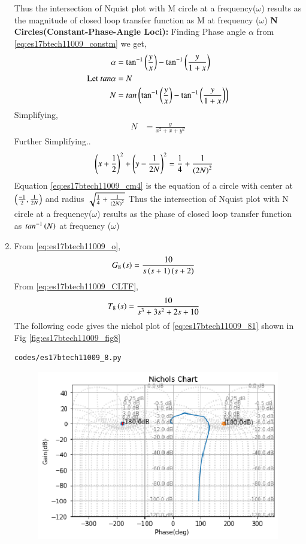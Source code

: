 \begin{enumerate}[label=\thesection.\arabic*.,ref=\thesection.\theenumi]
Thus the intersection of Nquist plot with M circle at a frequency($\omega$) results as the magnitude of closed loop transfer function as M at frequency ($\omega$)
\textbf{N Circles(Constant-Phase-Angle Loci):}
Finding Phase angle $\alpha$ from \eqref{eq:es17btech11009_constm} we get,
\begin{align}
\alpha &= \tan^{-1}\left(\frac{y}{x}\right)-\tan^{-1}\left(\frac{y}{1+x}\right)
\\
\text{Let } tan\alpha &= N
\\
N &= tan\left(\tan^{-1}\left(\frac{y}{x}\right)-\tan^{-1}\left(\frac{y}{1+x}\right)\right)
\end{align}
Simplifying,
\begin{align}
N &= \frac{y}{x^{2}+x+y^{2}}
\end{align}
Further Simplifying..
\begin{align}
\brak{x+\frac{1}{2}}^{2}+\brak{y-\frac{1}{2N}}^{2} &= \frac{1}{4}+\frac{1}{\brak{2N}^{2}}
\label{eq:es17btech11009_cm4}
\end{align}
Equation \eqref{eq:es17btech11009_cm4} is the equation of a circle with center at $\left(\frac{-1}{2},\frac{1}{2N}\right)$ and radius $\sqrt{\frac{1}{4}+\frac{1}{\left(2N\right)^{2}}}$
Thus the intersection of Nquist plot with N circle at a frequency($\omega$) results as the phase of closed loop transfer function as $tan^{-1}\left(N\right)$ at frequency ($\omega$)
\item
From \eqref{eq:es17btech11009_o},
\begin{align}
G_{8}\brak{s} &=\frac{10}{s\brak{s+1}\brak{s+2}}
\label{eq:es17btech1109_hh}
\end{align}
\solution 
From \eqref{eq:es17btech11009_CLTF},
\begin{align}
T_{8}\brak{s} &=\frac{10}{s^3 + 3s^2 + 2s +10}
\label{eq:es17btech11009_81}
\end{align}
The following code gives the nichol plot of \eqref{eq:es17btech11009_81} shown in Fig \ref{fig:es17btech11009_fig8}
\begin{lstlisting}
codes/es17btech11009_8.py
\end{lstlisting}
\begin{figure}[!h]
\includegraphics[width=\columnwidth]{./figs/es17btech11009_8.eps}

\end{figure}
\end{enumerate}

